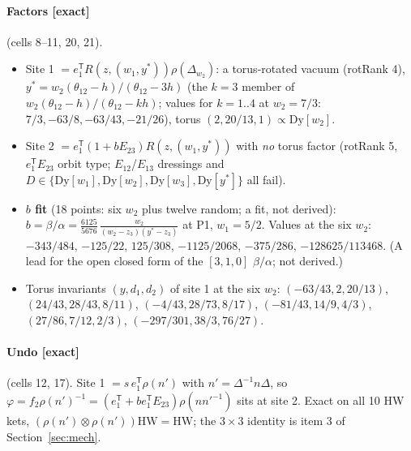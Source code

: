 \documentclass[11pt]{article}
\newcommand{\eT}{e_1^{\mathsf T}}
\newcommand{\thh}{\theta_{12}}
\newcommand{\ex}{\textbf{[exact]}}
\begin{document}
\paragraph{Factors \ex} (cells 8--11, 20, 21).
\begin{itemize}
\item Site 1 $=\eT R(z,(w_1,y^*))\rho(\Delta_{w_2})$: a torus-rotated vacuum (rotRank 4), $y^*=w_2(\thh-h)/(\thh-3h)$ (the $k=3$ member of $w_2(\thh-h)/(\thh-kh)$; values for $k=1..4$ at $w_2=7/3$: $7/3,-63/8,-63/43,-21/26$), torus $(2,20/13,1)\propto\mathrm{Dy}[w_2]$.
\item Site 2 $=\eT(1+bE_{23})R(z,(w_1,y^*))$ with \emph{no} torus factor (rotRank 5, $\eT E_{23}$ orbit type; $E_{12}$/$E_{13}$ dressings and $D\in\{\mathrm{Dy}[w_1],\mathrm{Dy}[w_2],\mathrm{Dy}[w_3],\mathrm{Dy}[y^*]\}$ all fail).
\item \textbf{$b$ fit} (18 points: six $w_2$ plus twelve random; a fit, not derived): $b=\beta/\alpha=\frac{6125}{5676}\,\frac{w_2}{(w_2-z_3)(y^*-z_3)}$ at P1, $w_1=5/2$. Values at the six $w_2$: $-343/484$, $-125/22$, $125/308$, $-1125/2068$, $-375/286$, $-128625/113468$. (A lead for the open closed form of the $[3,1,0]$ $\beta/\alpha$; not derived.)
\item Torus invariants $(y,d_1,d_2)$ of site 1 at the six $w_2$: $(-63/43,2,20/13)$, $(24/43,28/43,8/11)$, $(-4/43,28/73,8/17)$, $(-81/43,14/9,4/3)$, $(27/86,7/12,2/3)$, $(-297/301,38/3,76/27)$.
\end{itemize}

\paragraph{Undo \ex} (cells 12, 17). Site 1 $=s\,\eT\rho(n')$ with $n'=\Delta^{-1}n\Delta$, so $\varphi=f_2\rho(n')^{-1}=(\eT+b\eT E_{23})\rho(nn'^{-1})$ sits at site 2. Exact on all 10 HW kets, $(\rho(n')\otimes\rho(n'))\mathrm{HW}=\mathrm{HW}$; the $3\times3$ identity is item 3 of Section~\ref{sec:mech}.
\end{document}
